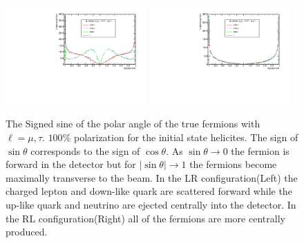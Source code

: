\begin{figure}


\includegraphics[width=0.48\textwidth]{hsLR.pdf}
\includegraphics[width=0.48\textwidth]{hsRL.pdf}
\caption{The Signed sine of the polar angle of the true fermions with $\ell = \mu,\tau$. $100\%$ polarization for the initial state helicites. The sign of $\sin\theta$ corresponds to the sign of $\cos\theta$. As $\sin\theta \rightarrow 0$ the fermion is forward in the detector but for $|\sin\theta| \rightarrow 1$ the fermions become maximally transverse to the beam. In the LR configuration(Left) the charged lepton and down-like quark are scattered forward while the up-like quark and neutrino are ejected centrally into the detector. In the RL configuration(Right) all of the fermions are more centrally produced. }
\label{fig:fangles}
\end{figure}

